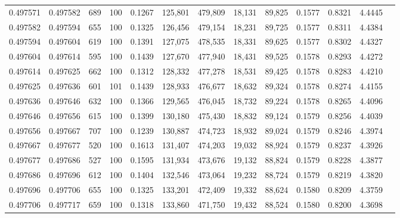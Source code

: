 \begin{tabular}{rrrrrrrrrrrrr}
0.497571 & 0.497582 &   689 & 100 &                                     0.1267 & 125,801 & 479,809 &  18,131 &  89,825 & 0.1577 & 0.8321 & 4.4445 \\
0.497582 & 0.497594 &   655 & 100 &                                     0.1325 & 126,456 & 479,154 &  18,231 &  89,725 & 0.1577 & 0.8311 & 4.4384 \\
0.497594 & 0.497604 &   619 & 100 &                                     0.1391 & 127,075 & 478,535 &  18,331 &  89,625 & 0.1577 & 0.8302 & 4.4327 \\
0.497604 & 0.497614 &   595 & 100 &                                     0.1439 & 127,670 & 477,940 &  18,431 &  89,525 & 0.1578 & 0.8293 & 4.4272 \\
0.497614 & 0.497625 &   662 & 100 &                                     0.1312 & 128,332 & 477,278 &  18,531 &  89,425 & 0.1578 & 0.8283 & 4.4210 \\
0.497625 & 0.497636 &   601 & 101 &                                     0.1439 & 128,933 & 476,677 &  18,632 &  89,324 & 0.1578 & 0.8274 & 4.4155 \\
0.497636 & 0.497646 &   632 & 100 &                                     0.1366 & 129,565 & 476,045 &  18,732 &  89,224 & 0.1578 & 0.8265 & 4.4096 \\
0.497646 & 0.497656 &   615 & 100 &                                     0.1399 & 130,180 & 475,430 &  18,832 &  89,124 & 0.1579 & 0.8256 & 4.4039 \\
0.497656 & 0.497667 &   707 & 100 &                                     0.1239 & 130,887 & 474,723 &  18,932 &  89,024 & 0.1579 & 0.8246 & 4.3974 \\
0.497667 & 0.497677 &   520 & 100 &                                     0.1613 & 131,407 & 474,203 &  19,032 &  88,924 & 0.1579 & 0.8237 & 4.3926 \\
0.497677 & 0.497686 &   527 & 100 &                                     0.1595 & 131,934 & 473,676 &  19,132 &  88,824 & 0.1579 & 0.8228 & 4.3877 \\
0.497686 & 0.497696 &   612 & 100 &                                     0.1404 & 132,546 & 473,064 &  19,232 &  88,724 & 0.1579 & 0.8219 & 4.3820 \\
0.497696 & 0.497706 &   655 & 100 &                                     0.1325 & 133,201 & 472,409 &  19,332 &  88,624 & 0.1580 & 0.8209 & 4.3759 \\
0.497706 & 0.497717 &   659 & 100 &                                     0.1318 & 133,860 & 471,750 &  19,432 &  88,524 & 0.1580 & 0.8200 & 4.3698 \\

\end{tabular}
